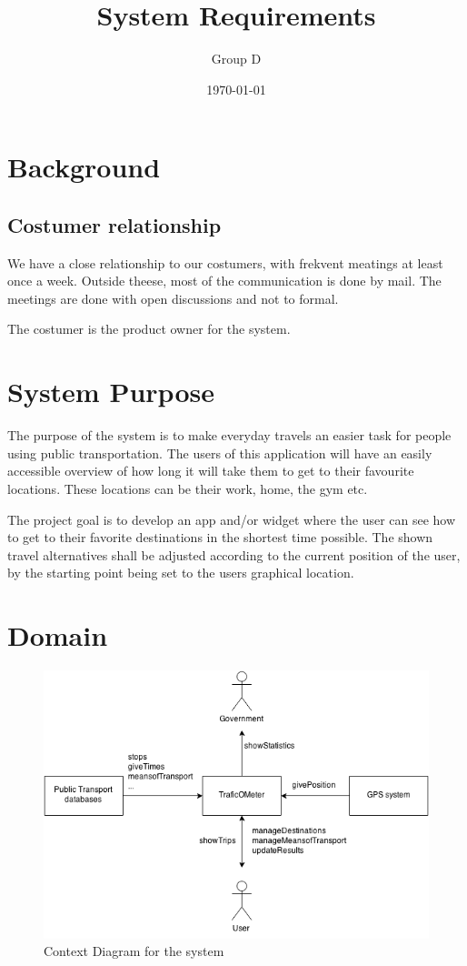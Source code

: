 \documentclass[a4paper]{article}
\title{System Requirements}
\author{Group D}
\date{\today}
\begin{document}
	\maketitle
	\thispagestyle{empty}
	\setcounter{page}{0}
	\pagebreak
	\tableofcontents
	\pagebreak
	



	\section{Background} %
	\label{sec:background}
	
		\subsection{Costumer relationship}
			We have a close relationship to our costumers, with frekvent meatings at least once a week. Outside theese, most of the communication is done by mail. The meetings are done with open discussions and not to formal. 

			The costumer is the product owner for the system.



	\section{System Purpose} %
	The purpose of the system is to make everyday travels an easier task for people using public transportation. The users of this application will have an easily accessible overview of how long it will take them to get to their favourite locations. These locations can be their work, home, the gym etc.
	
	
The project goal is to develop an app and/or widget where the user can see how to get to their favorite destinations in the shortest time possible. The shown travel alternatives shall be adjusted according to the current position of the user, by the starting point being set to the users graphical location.
	\section{Domain}
		\begin{figure}[h]
				\includegraphics[scale=0.65]{Context-v1.png}
			\caption{Context Diagram for the system}
		\end{figure}
\end{document}
